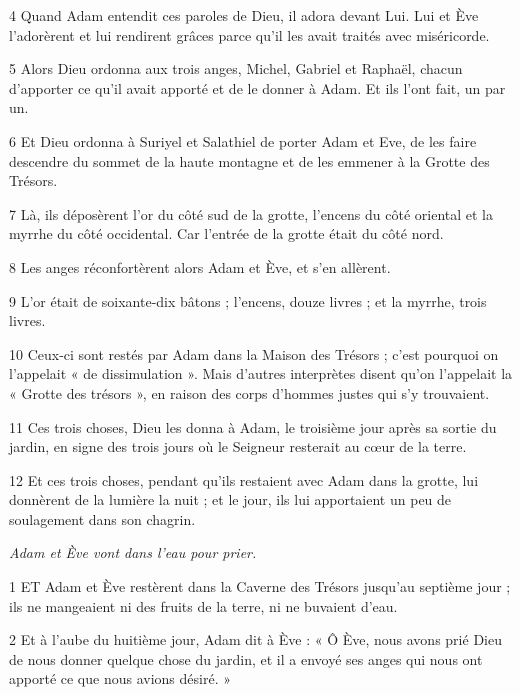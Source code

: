 \par 4 Quand Adam entendit ces paroles de Dieu, il adora devant Lui. Lui et Ève l'adorèrent et lui rendirent grâces parce qu'il les avait traités avec miséricorde.

\par 5 Alors Dieu ordonna aux trois anges, Michel, Gabriel et Raphaël, chacun d'apporter ce qu'il avait apporté et de le donner à Adam. Et ils l’ont fait, un par un.

\par 6 Et Dieu ordonna à Suriyel et Salathiel de porter Adam et Eve, de les faire descendre du sommet de la haute montagne et de les emmener à la Grotte des Trésors.

\par 7 Là, ils déposèrent l'or du côté sud de la grotte, l'encens du côté oriental et la myrrhe du côté occidental. Car l’entrée de la grotte était du côté nord.

\par 8 Les anges réconfortèrent alors Adam et Ève, et s'en allèrent.

\par 9 L'or était de soixante-dix bâtons ; l'encens, douze livres ; et la myrrhe, trois livres.

\par 10 Ceux-ci sont restés par Adam dans la Maison des Trésors ; c'est pourquoi on l'appelait « de dissimulation ». Mais d’autres interprètes disent qu’on l’appelait la « Grotte des trésors », en raison des corps d’hommes justes qui s’y trouvaient.

\par 11 Ces trois choses, Dieu les donna à Adam, le troisième jour après sa sortie du jardin, en signe des trois jours où le Seigneur resterait au cœur de la terre.

\par 12 Et ces trois choses, pendant qu'ils restaient avec Adam dans la grotte, lui donnèrent de la lumière la nuit ; et le jour, ils lui apportaient un peu de soulagement dans son chagrin.


\par \textit{Adam et Ève vont dans l'eau pour prier.}

\par 1 ET Adam et Ève restèrent dans la Caverne des Trésors jusqu'au septième jour ; ils ne mangeaient ni des fruits de la terre, ni ne buvaient d'eau.

\par 2 Et à l'aube du huitième jour, Adam dit à Ève : « Ô Ève, nous avons prié Dieu de nous donner quelque chose du jardin, et il a envoyé ses anges qui nous ont apporté ce que nous avions désiré. »

